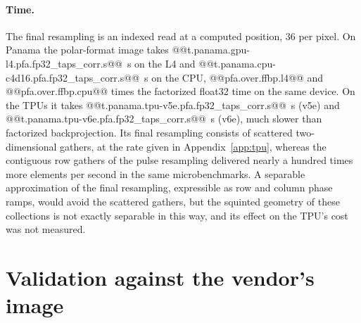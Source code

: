 \documentclass[11pt]{article}
\begin{document}
\paragraph{Time.} The final resampling is an indexed read at a computed position, 36 per pixel. On Panama the polar-format image takes @@t.panama.gpu-l4.pfa.fp32_taps_corr.s@@~s on the L4 and @@t.panama.cpu-c4d16.pfa.fp32_taps_corr.s@@~s on the CPU, @@pfa.over.ffbp.l4@@ and @@pfa.over.ffbp.cpu@@ times the factorized float32 time on the same device. On the TPUs it takes @@t.panama.tpu-v5e.pfa.fp32_taps_corr.s@@~s (v5e) and @@t.panama.tpu-v6e.pfa.fp32_taps_corr.s@@~s (v6e), much slower than factorized backprojection. Its final resampling consists of scattered two-dimensional gathers, at the rate given in Appendix~\ref{app:tpu}, whereas the contiguous row gathers of the pulse resampling delivered nearly a hundred times more elements per second in the same microbenchmarks. A separable approximation of the final resampling, expressible as row and column phase ramps, would avoid the scattered gathers, but the squinted geometry of these collections is not exactly separable in this way, and its effect on the TPU's cost was not measured.

\section{Validation against the vendor's image}
\label{app:sicd}
\end{document}

